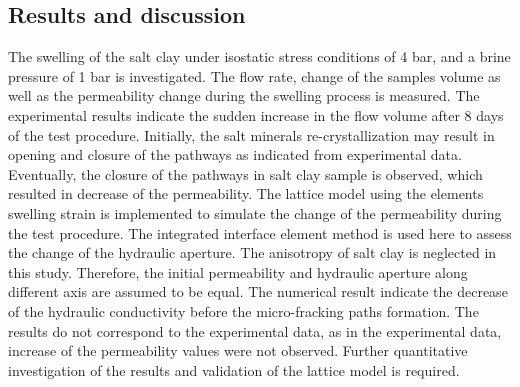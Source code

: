 
\subsection{Results and discussion}

The swelling of the salt clay under isostatic stress conditions of 4 bar, and a brine pressure of 1 bar is investigated. The flow rate, change of the samples volume as well as the permeability change during the swelling process is measured. The experimental results indicate the sudden increase in the flow volume after 8 days of the test procedure. Initially, the salt minerals re-crystallization may result in opening and closure of the pathways as indicated from experimental data. Eventually, the closure of the pathways in salt clay sample is observed, which resulted in decrease of the permeability. The lattice model using the elements swelling strain is implemented to simulate the change of the permeability during the test procedure. The integrated interface element method is used here to assess the change of the hydraulic aperture. The anisotropy of salt clay is neglected in this study. Therefore, the initial permeability and hydraulic aperture along different axis are assumed to be equal. The numerical result indicate the decrease of the hydraulic conductivity before the micro-fracking paths formation. The results do not correspond to the experimental data, as in the experimental data, increase of the permeability values were not observed. Further quantitative investigation of the results and validation of the lattice model is required. 